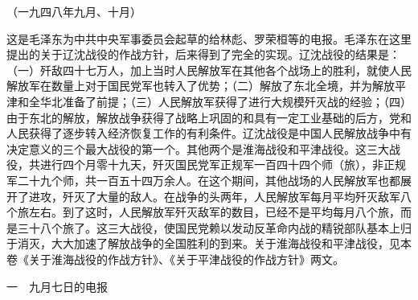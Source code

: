 \documentclass[UTF-8, a5paper, 12pt]{ctexart}
\begin{document}
（一九四八年九月、十月）

这是毛泽东为中共中央军事委员会起草的给林彪、罗荣桓等的电报。毛泽东在这里提出的关于辽沈战役的作战方针，后来得到了完全的实现。辽沈战役的结果是：（一）歼敌四十七万人，加上当时人民解放军在其他各个战场上的胜利，就使人民解放军在数量上对于国民党军也转入了优势；（二）解放了东北全境，并为解放平津和全华北准备了前提；（三）人民解放军获得了进行大规模歼灭战的经验；（四）由于东北的解放，解放战争获得了战略上巩固的和具有一定工业基础的后方，党和人民获得了逐步转入经济恢复工作的有利条件。辽沈战役是中国人民解放战争中有决定意义的三个最大战役的第一个。其他两个是淮海战役和平津战役。这三大战役，共进行四个月零十九天，歼灭国民党军正规军一百四十四个师（旅），非正规军二十九个师，共一百五十四万余人。在这个期间，其他战场的人民解放军也都展开了进攻，歼灭了大量的敌人。在战争的头两年，人民解放军每月平均歼灭敌军八个旅左右。到了这时，人民解放军歼灭敌军的数目，已经不是平均每月八个旅，而是三十八个旅了。这三大战役，使国民党赖以发动反革命内战的精锐部队基本上归于消灭，大大加速了解放战争的全国胜利的到来。关于淮海战役和平津战役，见本卷《关于淮海战役的作战方针》、《关于平津战役的作战方针》两文。

一　九月七日的电报
\end{document}
